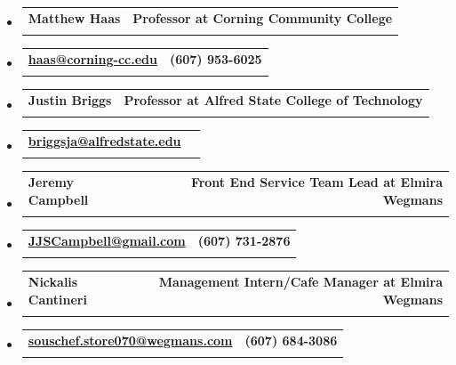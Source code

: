 \documentclass[letterpaper,11pt]{article}
\makeatletter
\newcommand{\resumeSubheading}[4]{
  \vspace{-2pt}\item
    \begin{tabular*}{1.0\textwidth}[t]{l@{\extracolsep{\fill}}r}
      \textbf{#1} & \textbf{\small #2} \\
      \textit{\small#3} & \textit{\small #4} \\
    \end{tabular*}\vspace{-7pt}
}
\newcommand{\resumeSubHeadingListStart}{\begin{itemize}[leftmargin=0.0in, label={}]}
\newcommand{\resumeSubHeadingListEnd}{\end{itemize}}
\makeatother
\begin{document}
\resumeSubHeadingListStart
\resumeSubheading{Matthew Haas}{Professor at Corning Community College}{}{}
\vspace{-20pt}
\resumeSubheading{\href{mailto:haas@corning-cc.edu}{haas@corning-cc.edu}}{(607) 953-6025}{}{}
\vspace{-10pt}

\resumeSubheading{Justin Briggs}{Professor at Alfred State College of Technology}{}{}
\vspace{-20pt}
\resumeSubheading{\href{mailto:briggsja@alfredstate.edu}{briggsja@alfredstate.edu}}{}{}{}
\vspace{-10pt}

\resumeSubheading{Jeremy Campbell}{Front End Service Team Lead at Elmira Wegmans}{}{}
\vspace{-20pt}
\resumeSubheading{\href{mailto:JJSCampbell@gmail.com}{JJSCampbell@gmail.com}}{(607) 731-2876}{}{}
\vspace{-10pt}

\resumeSubheading{Nickalis Cantineri}{Management Intern/Cafe Manager at Elmira Wegmans}{}{}
\vspace{-20pt}
\resumeSubheading{\href{mailto:seafood.store070@wegmans.com}{souschef.store070@wegmans.com}}{(607) 684-3086}{}{}
\vspace{-10pt}

\resumeSubHeadingListEnd
\end{document}
